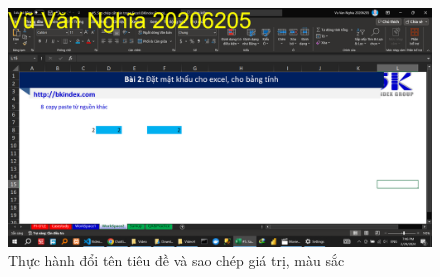 \documentclass{article}
\begin{document}

\begin{figure}[h]
\centering
\includegraphics[scale = 0.15]{Video4/ThucHanh/1.png}
\caption{Thực hành đổi tên tiêu đề và sao chép giá trị, màu sắc}
\end{figure}
\end{document}
